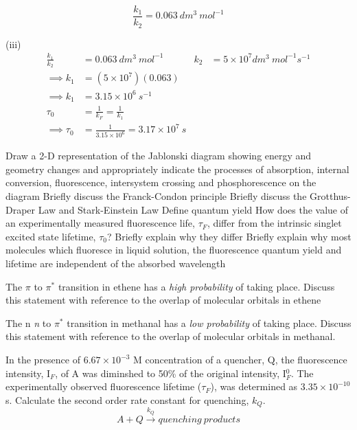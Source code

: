 \documentclass[a4paper,12pt,titlepage]{article}
\begin{document}
\begin{ExerciseList}
\begin{center}
\end{center}

\[\frac{k_1}{k_2} = 0.063\ dm^3\ mol^{-1}\]

(iii)
\begin{align*}
\frac{k_1}{k_2} &= 0.063\ dm^3\ mol^{-1}	&	k_2 &= 5\times 10^7 dm^3\ mol^{-1}s^{-1}\\
\implies k_1 &= (5\times10^7)(0.063)\\
\implies k_1 &= 3.15\times10^6\ s^{-1}\\
\tau_0 &=\frac{1}{k_F} = \frac{1}{k_1}\\
\implies \tau_0 &= \frac{1}{3.15\times10^6} = 3.17\times10^7\ s
\end{align*}

\Exercise Draw a 2-D representation of the Jablonski diagram showing energy and geometry changes and appropriately indicate the processes of absorption, internal conversion, fluorescence, intersystem crossing and phosphorescence on the diagram
\Exercise Briefly discuss the Franck-Condon principle
\Exercise Briefly discuss the Grotthus-Draper Law and Stark-Einstein Law
\Exercise Define quantum yield
\Exercise How does the value of an experimentally measured fluorescence life, \(\tau_F\), differ from the intrinsic singlet excited state lifetime, \(\tau_0\)? Briefly explain why they differ
\Exercise Briefly explain why most molecules which fluoresce in liquid solution, the fluorescence quantum yield and lifetime are independent of the absorbed wavelength

\Exercise The \(\pi\) to \(\pi^*\) transition in ethene has a \emph{high probability} of taking place. Discuss this statement with reference to the overlap of molecular orbitals in ethene

\Exercise The n \textit{n} to \(\pi^*\) transition in methanal has a \emph{low probability} of taking place. Discuss this statement with reference to the overlap of molecular orbitals in methanal.

\Exercise In the presence of \(6.67\times10^{-3}\) M concentration of a quencher, Q, the fluorescence intensity, I\(_F\), of A was diminshed to 50\% of the original intensity, I\(^0_F\). The experimentally observed fluorescence lifetime (\(\tau_F\)), was determined as \(3.35\times 10^{-10}\) s. Calculate the second order rate constant for quenching, \(k_Q\).
\[ A + Q \xrightarrow{k_Q} quenching\ products\]


\end{ExerciseList}
\end{document}
